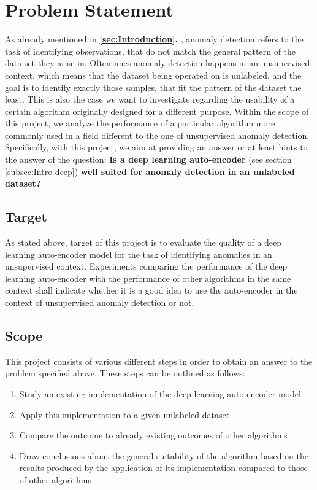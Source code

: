 \documentclass{vldb}
\begin{document}


\section{Problem Statement} \label{problem_statement}
As already mentioned in \textbf{\ref{sec:Introduction}. }, anomaly detection refers to the task of identifying observations, that do not match the general pattern of the data set they arise in. Oftentimes anomaly detection happens in an unsupervised context, which means that the dataset being operated on is unlabeled, and the goal is to identify exactly those samples, that fit the pattern of the dataset the least. This is also the case we want to investigate regarding the usability of a certain algorithm originally designed for a different purpose. Within the scope of this project, we analyze the performance of a particular algorithm more commonly used in a field different to the one of unsupervised anomaly detection. Specifically, with this project, we aim at providing an answer or at least hints to the answer of the question: \textbf{Is a deep learning auto-encoder} (see section \ref{subsec:Intro-deep}) \textbf{well suited for anomaly detection in an unlabeled dataset?}


\subsection{Target}\label{target}
As stated above, target of this project is to evaluate the quality of a deep learning auto-encoder model for the task of identifying anomalies in an unsupervised context. Experiments comparing the performance of the deep learning auto-encoder with the performance of other algorithms in the same context shall indicate whether it is a good idea to use the auto-encoder in the context of unsupervised anomaly detection or not.


\subsection{Scope}\label{ssec:scope}
This project consists of various different steps in order to obtain an answer to the problem specified above.
These steps can be outlined as follows:
\begin{enumerate}
	\item Study an existing implementation of the deep learning auto-encoder model
	\item Apply this implementation to a given unlabeled dataset
	\item Compare the outcome to already existing outcomes of other algorithms
	\item Draw conclusions about the general suitability of the algorithm based on the results produced by the application of its implementation compared to those of other algorithms
\end{enumerate}
\end{document}
